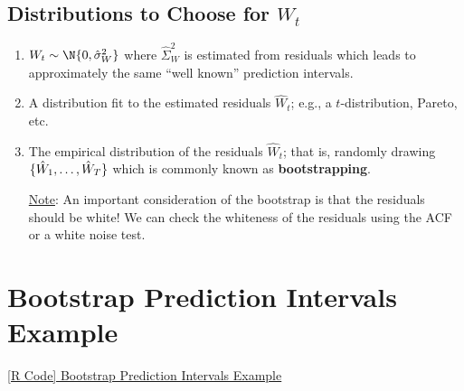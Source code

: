 \subsection*{Distributions to Choose for $ W_t $}
\begin{enumerate}[(1)]
      \item $ W_t \sim \N{0,\hat{\sigma}_W^2} $ where $ \hat{\Sigma}_W^2 $ is estimated from residuals which
            leads to approximately the same ``well known'' prediction intervals.
      \item A distribution fit to the estimated residuals $ \hat{W}_t $; e.g., a $ t $-distribution,
            Pareto, etc.
      \item The empirical distribution of the residuals $ \hat{W}_t $; that is,
            randomly drawing $ \{\hat{W}_1,\ldots,\hat{W}_{T}\} $ which is commonly known
            as \textbf{bootstrapping}.

            \underline{Note}: An important consideration of the bootstrap is that the residuals should be white!
            We can check the whiteness of the residuals using the ACF or a white noise test.
\end{enumerate}
\section{Bootstrap Prediction Intervals Example}
\href{https://github.com/Hextical/university-notes/blob/master/year-3/semester-2/STAT%20443/code/6.6%20-%20Bootstrap%20Prediction%20Intervals%20Example.R}{[R Code] Bootstrap Prediction Intervals Example}

